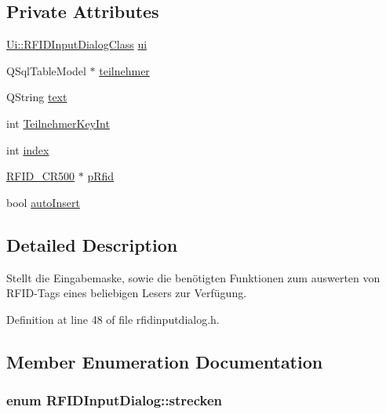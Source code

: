 \subsection*{Private Attributes}
\begin{CompactItemize}
\item 
\hyperlink{class_ui_1_1_r_f_i_d_input_dialog_class}{Ui::RFIDInputDialogClass} \hyperlink{class_r_f_i_d_input_dialog_e717744327dda404390c6be01b77180a}{ui}
\item 
QSqlTableModel $\ast$ \hyperlink{class_r_f_i_d_input_dialog_23e23da528d95589aec6670ef8b0b067}{teilnehmer}
\item 
QString \hyperlink{class_r_f_i_d_input_dialog_58508d18fe39d28748cbaea39b24d50b}{text}
\item 
int \hyperlink{class_r_f_i_d_input_dialog_557be7292bf8509e793dc17e79d18e75}{TeilnehmerKeyInt}
\item 
int \hyperlink{class_r_f_i_d_input_dialog_251579065abb62a0421867aafa5b275c}{index}
\item 
\hyperlink{class_r_f_i_d___c_r500}{RFID\_\-CR500} $\ast$ \hyperlink{class_r_f_i_d_input_dialog_2fffb8807b878f9debba8d9b13046854}{pRfid}
\item 
bool \hyperlink{class_r_f_i_d_input_dialog_2c4dff3a7602a6bca4d967b5a561942d}{autoInsert}
\end{CompactItemize}


\subsection{Detailed Description}
Stellt die Eingabemaske, sowie die benötigten Funktionen zum auswerten von RFID-Tags eines beliebigen Lesers zur Verfügung. 

Definition at line 48 of file rfidinputdialog.h.

\subsection{Member Enumeration Documentation}
\hypertarget{class_r_f_i_d_input_dialog_711253f6ca49fde7b5e812a485d27a6c}{
\subsubsection[strecken]{\setlength{\rightskip}{0pt plus 5cm}enum {\bf RFIDInputDialog::strecken}}}
\label{class_r_f_i_d_input_dialog_711253f6ca49fde7b5e812a485d27a6c}


